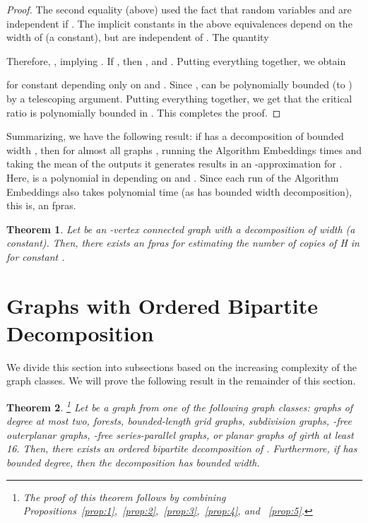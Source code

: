 \documentclass[11pt]{article}
\newtheorem{theorem}{Theorem}[section]
\begin{document}
\begin{proof}
The second equality (above) used the fact that random variables  and  are independent if  . The implicit constants in the above equivalences depend on the width of  (a constant), but are independent of . The quantity  
 
Therefore, , implying . If , then , and . Putting everything together, we obtain

for constant  depending only on  and . Since ,  can be polynomially bounded (to ) by a telescoping argument.
Putting everything together,  we get that the critical ratio  is polynomially bounded in . This completes the proof.
\end{proof} 


Summarizing, we have the following result: if  has a decomposition of bounded width , then for almost all graphs , running the Algorithm Embeddings  times  and taking the mean of the outputs it generates results in an -approximation for . Here,  is a polynomial in  depending on  and . Since each run of the Algorithm Embeddings also takes polynomial time (as  has bounded width decomposition), this is, an fpras. 

\begin{theorem} \label{thm:fpras}
Let  be an -vertex connected graph with a decomposition of width  (a constant). Then,   there exists an fpras for estimating the number of copies of H in  for constant .
\end{theorem}


\section{Graphs with Ordered Bipartite Decomposition}\label{exam}
We divide this section into subsections based on the increasing complexity of the graph classes. We will prove the following result in the remainder of this section. 

\begin{theorem}\!\footnote{The proof of this theorem follows by combining Propositions~\ref{prop:1},~\ref{prop:2},~\ref{prop:3},~\ref{prop:4}, and ~\ref{prop:5}.}  \label{thm:probg}
Let  be a graph from one of the following graph classes: graphs of degree at most two, forests, bounded-length grid graphs, subdivision graphs, -free outerplanar graphs, -free series-parallel graphs, or planar graphs of girth at least 16. Then,  there exists an ordered bipartite decomposition of . Furthermore, if  has bounded degree, then the decomposition has bounded width. 
\end{theorem}  
\end{document}
